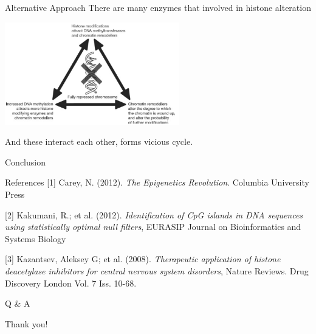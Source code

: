 \documentclass{beamer}
\begin{document}
    \begin{frame}{Alternative Approach}
        There are many enzymes that involved in histone alteration

        \begin{center}
        \includegraphics[height=12em]{model}
        \end{center}

        And these interact each other, forms vicious cycle.
    \end{frame}

    \begin{frame}{Conclusion}

    \end{frame}

    \begin{frame}{References}
        \footnotesize [1] Carey, N. (2012). \textit{The Epigenetics Revolution}. Columbia University Press
    
        \footnotesize [2] Kakumani, R.; et al. (2012). \textit{Identification of CpG islands in DNA sequences using statistically optimal null filters}, EURASIP Journal on Bioinformatics and Systems Biology 
    
        \footnotesize [3] Kazantsev, Aleksey G; et al. (2008). \textit{Therapeutic application of histone deacetylase inhibitors for central nervous system disorders}, Nature Reviews. Drug Discovery\; London Vol. 7 Iss. 10-68.
    \end{frame}

    \begin{frame}[plain]
        \centering
        \huge Q \& A
    \end{frame}

    \begin{frame}[plain]
        \centering
        \huge Thank you!
    \end{frame}
\end{document}
